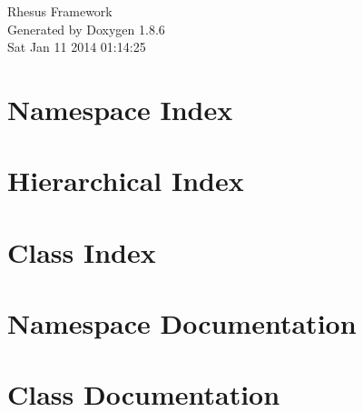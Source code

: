 \documentclass[twoside]{book}
\newcommand{\clearemptydoublepage}{%
  \newpage{\pagestyle{empty}\cleardoublepage}%
}
\begin{document}
\hypersetup{pageanchor=false}
\begin{titlepage}
\vspace*{7cm}
\begin{center}%
{\Large Rhesus Framework }\\
\vspace*{1cm}
{\large Generated by Doxygen 1.8.6}\\
\vspace*{0.5cm}
{\small Sat Jan 11 2014 01:14:25}\\
\end{center}
\end{titlepage}
\clearemptydoublepage
\tableofcontents
\clearemptydoublepage
{}
\hypersetup{pageanchor=true}

\chapter{Namespace Index}

\chapter{Hierarchical Index}

\chapter{Class Index}

\chapter{Namespace Documentation}



\chapter{Class Documentation}
















\newpage
{}
{}
\printindex
\end{document}
